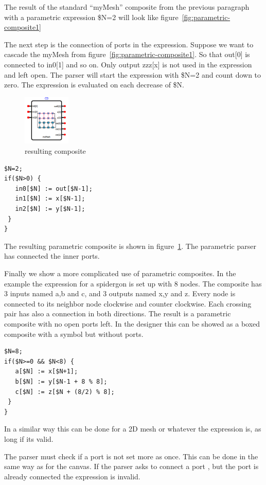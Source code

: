The result of the standard ``myMesh'' composite from the previous paragraph with
a parametric expression \$N=2 will look like
figure~\ref{fig:parametric-composite1}

The next step is the connection of ports in the expression. Suppose we want to
cascade the myMesh from figure~\ref{fig:parametric-composite1}. So that out[0]
is connected to in0[1] and so on. Only output zzz[x] is not used in the
expression and left open. The parser will start the expression with \$N=2 and
count down to zero. The expression is evaluated on each decrease of \$N.

\begin{figure}
  \vspace{-20pt}
  \begin{center}
    \includegraphics[width=0.20\textwidth]{pictures/parametric-composite2}
  \caption{resulting composite}
  \label{fig:parametric-composite2}
  \end{center}
  \vspace{-30pt}
\end{figure}

\begin{lstlisting}
$N=2;
if($N>0) {
   in0[$N] := out[$N-1];
   in1[$N] := x[$N-1];
   in2[$N] := y[$N-1];
 }
}
\end{lstlisting}


The resulting parametric composite is shown in
figure~\ref{fig:parametric-composite2}. The parametric parser has connected the
inner ports.

Finally we show a more complicated use of parametric composites. In the example
the expression for a spidergon is set up with 8 nodes. The composite has 3
inputs named a,b and c, and 3 outputs named x,y and z. Every node is connected
to its neighbor node clockwise and counter clockwise. Each crossing pair has
also a connection in both directions. The result is a parametric composite with
no open ports left. In the designer this can be showed as a boxed composite with
a symbol but without ports.

\begin{lstlisting}
$N=8;
if($N>=0 && $N<8) {
   a[$N] := x[$N+1]; 
   b[$N] := y[$N-1 + 8 % 8];
   c[$N] := z[$N + (8/2) % 8];
 }
}
\end{lstlisting}

In a similar way this can be done for a 2D mesh or whatever the expression is,
as long if its valid.

The parser must check if a port is not set more as once. This can be done in the
same way as for the canvas. If the parser asks to connect a port , but the port
is already connected the expression is invalid.



\newpage
